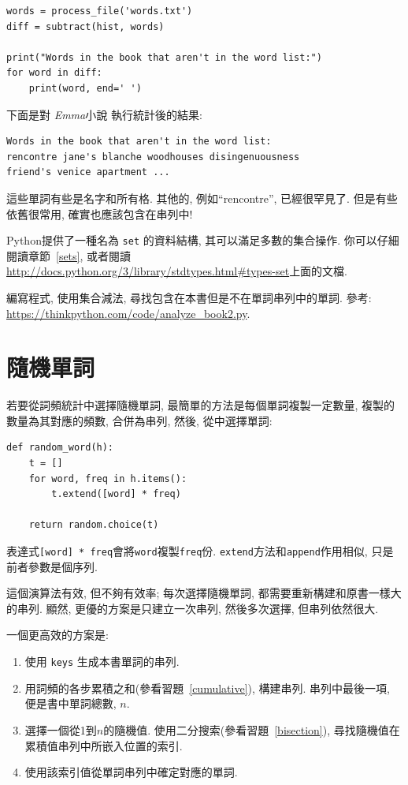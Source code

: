 \documentclass[10pt]{book}
\begin{document}
\begin{verbatim}
words = process_file('words.txt')
diff = subtract(hist, words)

print("Words in the book that aren't in the word list:")
for word in diff:
    print(word, end=' ')
\end{verbatim}
%
下面是對 {\em Emma}小說 執行統計後的結果:

\begin{verbatim}
Words in the book that aren't in the word list:
rencontre jane's blanche woodhouses disingenuousness 
friend's venice apartment ...
\end{verbatim}
%
這些單詞有些是名字和所有格. 其他的, 例如``rencontre'', 已經很罕見了. 
但是有些依舊很常用, 確實也應該包含在串列中!

\begin{exercise}

Python提供了一種名為 {\tt set} 的資料結構, 其可以滿足多數的集合操作. 
你可以仔細閱讀章節~\ref{sets}, 或者閱讀
\url{http://docs.python.org/3/library/stdtypes.html#types-set}上面的文檔. 

編寫程式, 使用集合減法, 尋找包含在本書但是不在單詞串列中的單詞. 
參考:
\url{https://thinkpython.com/code/analyze_book2.py}.

\end{exercise}


\section{隨機單詞}
\label{randomwords}

若要從詞頻統計中選擇隨機單詞, 最簡單的方法是每個單詞複製一定數量, 
複製的數量為其對應的頻數, 合併為串列, 然後, 從中選擇單詞:

\begin{verbatim}
def random_word(h):
    t = []
    for word, freq in h.items():
        t.extend([word] * freq)

    return random.choice(t)
\end{verbatim}
%
表達式{\tt [word] * freq}會將{\tt word}複製{\tt freq}份. 
{\tt extend}方法和{\tt append}作用相似, 只是前者參數是個序列. 

這個演算法有效, 但不夠有效率; 每次選擇隨機單詞, 
都需要重新構建和原書一樣大的串列. 
顯然, 更優的方案是只建立一次串列, 然後多次選擇, 但串列依然很大.

一個更高效的方案是:

\begin{enumerate}

\item 使用 {\tt keys} 生成本書單詞的串列.

\item 用詞頻的各步累積之和(參看習題~\ref{cumulative}), 構建串列. 
串列中最後一項, 便是書中單詞總數, $n$. 
  
\item 選擇一個從1到$n$的隨機值. 使用二分搜索(參看習題~\ref{bisection}), 
尋找隨機值在累積值串列中所嵌入位置的索引. 

\item 使用該索引值從單詞串列中確定對應的單詞. 

\end{enumerate}
\end{document}
